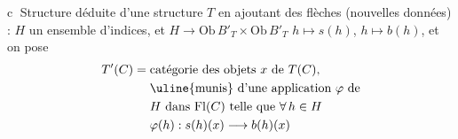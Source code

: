 
\textcircled{c} Structure déduite d'une structure $T$ en ajoutant des flèches (nouvelles données) :   $H$ un ensemble d'indices, et $H\longrightarrow\mathrm{Ob}\,B'_T\times\mathrm{Ob}\,B'_T$ \quad $h\longmapsto s(h)$, $h\longmapsto b(h)$, et on pose
\[
\begin{aligned}
T'(C)={}&\text{catégorie des objets }x\text{ de }T(C),\\
&\text{\uline{munis} d'une application }\varphi\text{ de}\\
&H\text{ dans }\mathrm{Fl}(C)\text{ telle que }\forall\,h\in H\\
&\varphi(h):s(h)(x)\longrightarrow b(h)(x)
\end{aligned}
\]
